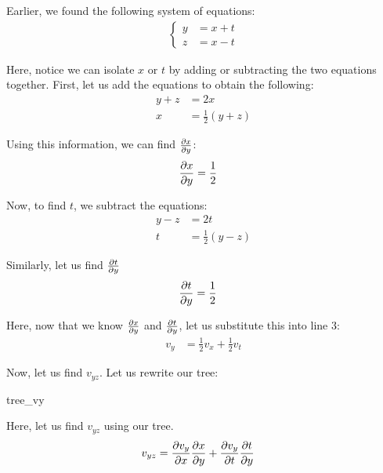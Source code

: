 Earlier, we found the following system of equations:
\begin{align}
  \begin{cases}
    y & = x + t\\
    z & = x - t
  \end{cases}
\end{align}

Here, notice we can isolate $x$ or $t$ by adding or subtracting
the two equations together. First, let us add the equations to
obtain the following:
%
\begin{align}
  y + z & = 2x\\
  x & = \frac{1}{2}(y + z)
\end{align}

Using this information, we can find $\frac{\partial x}{\partial y}$:
%
\begin{align}
  \frac{\partial x}{\partial y} & = \frac{1}{2}
\end{align}

Now, to find $t$, we subtract the equations:
%
\begin{align}
  y - z & = 2t\\
  t & = \frac{1}{2}(y - z)
\end{align}

Similarly, let us find $\frac{\partial t}{\partial y}$
%
\begin{align}
  \frac{\partial t}{\partial y} & = \frac{1}{2}
\end{align}

Here, now that we know $\frac{\partial x}{\partial y}$ and $\frac{\partial t}{\partial y}$, let us substitute this into line 3:
%
\begin{align}
  v_y & = \frac{1}{2} v_x + \frac{1}{2} v_t
\end{align}

Now, let us find $v_{yz}$. Let us rewrite our tree:
\begin{center}
  {tree_vy}
\end{center}

Here, let us find $v_{yz}$ using our tree.
%
\begin{align}
  v_{yz} & = \frac{\partial v_y}{\partial x} \frac{\partial x}{\partial y} + \frac{\partial v_y}{\partial t} \frac{\partial t}{\partial y}
\end{align}

